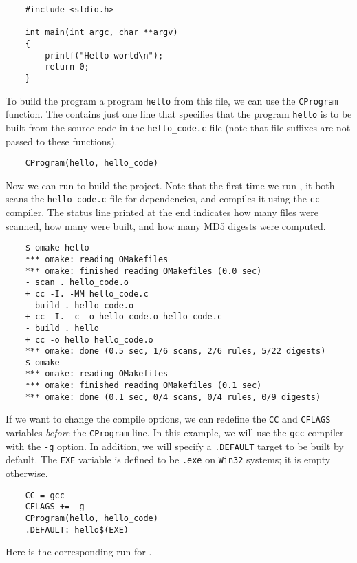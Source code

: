 \begin{verbatim}
    #include <stdio.h>

    int main(int argc, char **argv)
    {
        printf("Hello world\n");
        return 0;
    }
\end{verbatim}

To build the program a program \verb+hello+ from this file, we can use the \verb+CProgram+ function.
The  contains just one line that specifies that the program \verb+hello+ is
to be built from the source code in the \verb+hello_code.c+ file (note that file suffixes
are not passed to these functions).

\begin{verbatim}
    CProgram(hello, hello_code)
\end{verbatim}

Now we can run  to build the project.  Note that the first time we run ,
it both scans the \verb+hello_code.c+ file for dependencies, and compiles it using the \verb+cc+
compiler.  The status line printed at the end indicates how many files were scanned, how many
were built, and how many MD5 digests were computed.

\begin{verbatim}
    $ omake hello
    *** omake: reading OMakefiles
    *** omake: finished reading OMakefiles (0.0 sec)
    - scan . hello_code.o
    + cc -I. -MM hello_code.c
    - build . hello_code.o
    + cc -I. -c -o hello_code.o hello_code.c
    - build . hello
    + cc -o hello hello_code.o
    *** omake: done (0.5 sec, 1/6 scans, 2/6 rules, 5/22 digests)
    $ omake
    *** omake: reading OMakefiles
    *** omake: finished reading OMakefiles (0.1 sec)
    *** omake: done (0.1 sec, 0/4 scans, 0/4 rules, 0/9 digests)
\end{verbatim}

If we want to change the compile options, we can redefine the \verb+CC+ and \verb+CFLAGS+
variables \emph{before} the \verb+CProgram+ line.  In this example, we will use the \verb+gcc+
compiler with the \verb+-g+ option.  In addition, we will specify a \verb+.DEFAULT+ target
to be built by default.  The \verb+EXE+ variable is defined to be \verb+.exe+ on \verb+Win32+
systems; it is empty otherwise.

\begin{verbatim}
    CC = gcc
    CFLAGS += -g
    CProgram(hello, hello_code)
    .DEFAULT: hello$(EXE)
\end{verbatim}

Here is the corresponding run for .

